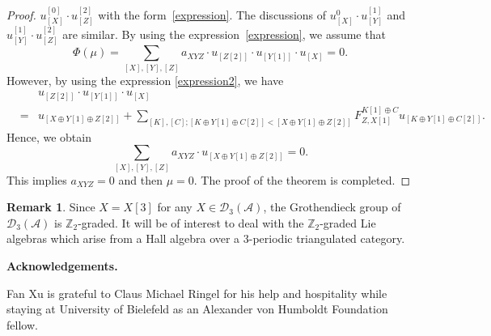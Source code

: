 \documentclass{amsart}
\theoremstyle{definition}
\newtheorem{remark}[theorem]{Remark}
\numberwithin{equation}{section}
\begin{document}
\begin{proof}
$u_{[X]}^{[0]}\cdot u_{[Z]}^{[2]}$ with the form~\eqref{expression}.
The discussions of $u_{[X]}^{0}\cdot u_{[Y]}^{[1]}$ and
$u_{[Y]}^{[1]}\cdot u_{[Z]}^{[2]}$ are similar. By using the
expression~\eqref{expression}, we assume that
$$
\Phi(\mu)=\sum_{[X], [Y], [Z]}a_{XYZ}\cdot u_{[Z[2]]}\cdot
u_{[Y[1]]}\cdot u_{[X]}=0.
$$
However, by using the expression \eqref{expression2}, we have
\begin{displaymath}
\begin{array}{lcl}
& &u_{[Z[2]]}\cdot u_{[Y[1]]}\cdot u_{[X]} \\
&=& u_{[X\oplus Y[1]\oplus Z[2]]}+\displaystyle\sum_{[K], [C];
[K\oplus Y[1]\oplus C[2]]<[X\oplus Y[1]\oplus Z[2]]}F_{Z,
X[1]}^{K[1]\oplus C}u_{[K\oplus Y[1]\oplus C[2]]}.
\end{array}
\end{displaymath}
Hence, we obtain
$$
\sum_{[X], [Y], [Z]}a_{XYZ}\cdot u_{[X\oplus Y[1]\oplus Z[2]]}=0.
$$
This implies $a_{XYZ}=0$ and then $\mu=0.$ The proof of the theorem
is completed.
\end{proof}

\begin{remark}
Since $X=X[3]$ for any $X\in {{\mathcal{D}}}_3(\mathcal{A})$, the Grothendieck
group of ${{\mathcal{D}}}_3(\mathcal{A})$ is $\mathbb{Z}_2$-graded.  It will be
of interest to deal with the $\mathbb{Z}_2$-graded Lie algebras
which arise from a Hall algebra over a $3$-periodic triangulated
category.

\end{remark}
\begin{center}
{\textbf{Acknowledgements.}}
\end{center}
Fan Xu is grateful to Claus Michael Ringel for his help and
hospitality while staying at University of Bielefeld as an Alexander
von Humboldt Foundation fellow.
\end{document}
